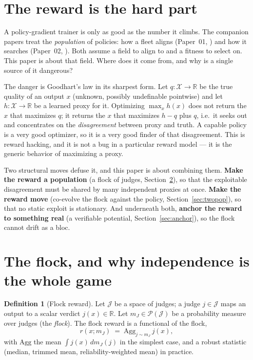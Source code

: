 \documentclass[11pt]{article}
\theoremstyle{definition}
\newtheorem{definition}{Definition}
\theoremstyle{remark}
\newcommand{\R}{\mathbb{R}}
\newcommand{\mJ}{m_{J}}
\newcommand{\Prob}{\mathcal{P}}
\newcommand{\Xspace}{\mathcal{X}}
\newcommand{\Jspace}{\mathcal{J}}
\begin{document}
\section{The reward is the hard part}
\label{sec:intro}

A policy-gradient trainer is only as good as the number it climbs. The companion papers treat the
\emph{population} of policies: how a fleet aligns (Paper~01, \cite{hanzo-mfa}) and how it searches
(Paper~02, \cite{hanzo-evo}). Both assume a field to align to and a fitness to select on. This paper is
about that field. Where does it come from, and why is a single source of it dangerous?

The danger is Goodhart's law in its sharpest form. Let $q:\Xspace\to\R$ be the true quality of an output
$x$ (unknown, possibly undefinable pointwise) and let $h:\Xspace\to\R$ be a learned proxy for it. Optimizing
$\max_{x} h(x)$ does not return the $x$ that maximizes $q$; it returns the $x$ that maximizes $h-q$ plus
$q$, i.e.\ it seeks out and concentrates on the \emph{disagreement} between proxy and truth. A capable
policy is a very good optimizer, so it is a very good finder of that disagreement. This is reward hacking,
and it is not a bug in a particular reward model --- it is the generic behavior of maximizing a proxy.

Two structural moves defuse it, and this paper is about combining them. \textbf{Make the reward a
population} (a flock of judges, Section~\ref{sec:flock}), so that the exploitable disagreement must be
shared by many independent proxies at once. \textbf{Make the reward move} (co-evolve the flock against the
policy, Section~\ref{sec:twopop}), so that no static exploit is stationary. And underneath both,
\textbf{anchor the reward to something real} (a verifiable potential, Section~\ref{sec:anchor}), so the
flock cannot drift as a bloc.

\section{The flock, and why independence is the whole game}
\label{sec:flock}

\begin{definition}[Flock reward]
Let $\Jspace$ be a space of judges; a judge $j\in\Jspace$ maps an output to a scalar verdict
$j(x)\in\R$. Let $\mJ\in\Prob(\Jspace)$ be a probability measure over judges (the \emph{flock}). The flock
reward is a functional of the flock,
\[
  r(x;\mJ) \;=\; \mathrm{Agg}_{j\sim\mJ}\, j(x),
\]
with $\mathrm{Agg}$ the mean $\int j(x)\,d\mJ(j)$ in the simplest case, and a robust statistic (median,
trimmed mean, reliability-weighted mean) in practice.
\end{definition}
\end{document}
